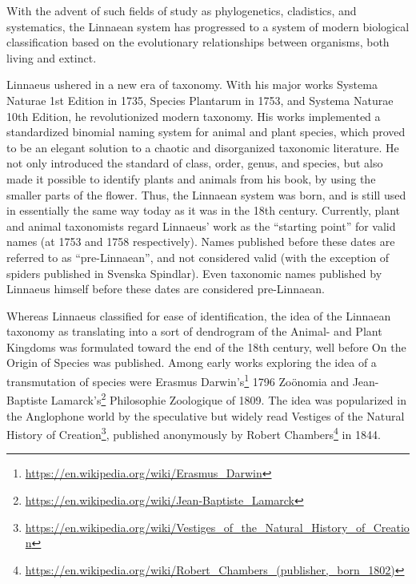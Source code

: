 \documentclass[]{book}
\let\rmarkdownfootnote\footnote%
\def\footnote{\protect\rmarkdownfootnote}
\renewcommand{\href}[2]{#2\footnote{\url{#1}}}
\theoremstyle{definition}
\theoremstyle{definition}
\theoremstyle{definition}
\theoremstyle{remark}
\begin{document}
With the advent of such fields of study as phylogenetics, cladistics,
and systematics, the Linnaean system has progressed to a system of
modern biological classification based on the evolutionary relationships
between organisms, both living and extinct.

Linnaeus ushered in a new era of taxonomy. With his major works
Systema Naturae 1st Edition in 1735, Species Plantarum in 1753, and
Systema Naturae 10th Edition, he revolutionized modern taxonomy. His
works implemented a standardized binomial naming system for animal and
plant species, which proved to be an elegant solution to a chaotic and
disorganized taxonomic literature. He not only introduced the standard
of class, order, genus, and species, but also made it possible to
identify plants and animals from his book, by using the smaller parts of
the flower. Thus, the Linnaean system was born, and is still used in
essentially the same way today as it was in the 18th century. Currently,
plant and animal taxonomists regard Linnaeus' work as the ``starting
point'' for valid names (at 1753 and 1758 respectively). Names published
before these dates are referred to as ``pre-Linnaean'', and not
considered valid (with the exception of spiders published in Svenska
Spindlar). Even taxonomic names published by Linnaeus himself before
these dates are considered pre-Linnaean.

Whereas Linnaeus classified for ease of identification, the idea of the
Linnaean taxonomy as translating into a sort of dendrogram of the
Animal- and Plant Kingdoms was formulated toward the end of the 18th
century, well before On the Origin of Species was published. Among early
works exploring the idea of a transmutation of species were Erasmus \href{https://en.wikipedia.org/wiki/Erasmus_Darwin}{Darwin's} 1796 Zoönomia and Jean-Baptiste \href{https://en.wikipedia.org/wiki/Jean-Baptiste_Lamarck}{Lamarck's} Philosophie
Zoologique of 1809. The idea was popularized in the Anglophone world by
the speculative but widely read \href{https://en.wikipedia.org/wiki/Vestiges_of_the_Natural_History_of_Creation}{Vestiges of the Natural History of
Creation}, published anonymously by Robert \href{https://en.wikipedia.org/wiki/Robert_Chambers_(publisher,_born_1802)}{Chambers} in 1844.
\end{document}
